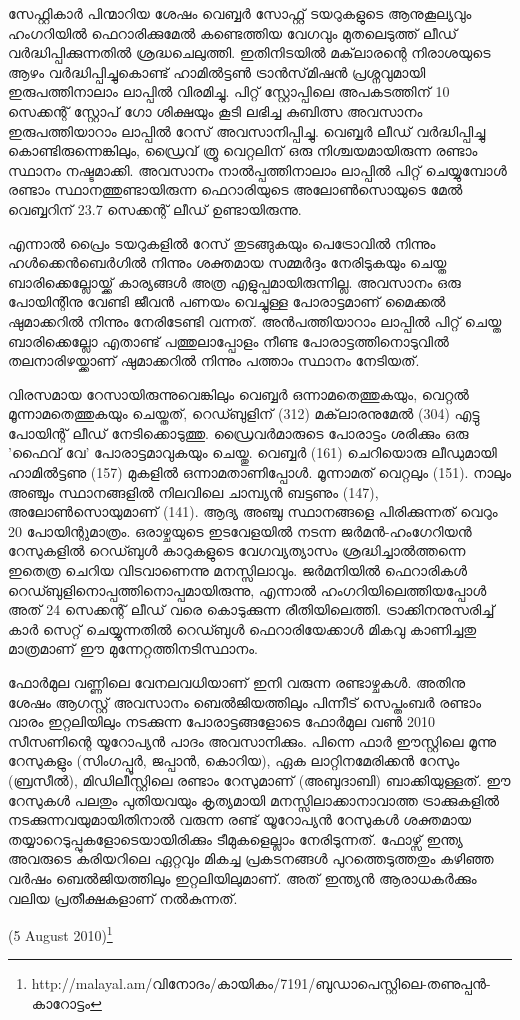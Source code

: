 സേഫ്റ്റികാര്‍ പിന്മാറിയ ശേഷം വെബ്ബര്‍ സോഫ്റ്റ് ടയറുകളുടെ ആനുകൂല്യവും ഹംഗറിയില്‍ ഫെറാരിക്കുമേല്‍ കണ്ടെത്തിയ 
വേഗവും മുതലെടുത്ത് ലീഡ് വര്‍ദ്ധിപ്പിക്കുന്നതില്‍ ശ്രദ്ധചെലുത്തി. ഇതിനിടയില്‍ മക്‌ലാരന്റെ നിരാശയുടെ ആഴം 
വര്‍ദ്ധിപ്പിച്ചുകൊണ്ട് ഹാമില്‍ട്ടണ്‍ ട്രാന്‍സ്‌മിഷന്‍ പ്രശ്നവുമായി ഇരുപത്തിനാലാം ലാപ്പില്‍ വിരമിച്ചു. പിറ്റ് സ്റ്റോപ്പിലെ 
അപകടത്തിന് 10 സെക്കന്റ് സ്റ്റോപ് ഗോ ശിക്ഷയും കൂടി ലഭിച്ച കുബിത്സ അവസാനം ഇരുപത്തിയാറാം ലാപ്പില്‍ 
റേസ് അവസാനിപ്പിച്ചു. വെബ്ബര്‍ ലീഡ് വര്‍ദ്ധിപ്പിച്ചു കൊണ്ടിരുന്നെങ്കിലും, ഡ്രൈവ് ത്രൂ വെറ്റലിന് ഒരു 
നിശ്ചയമായിരുന്ന രണ്ടാം സ്ഥാനം നഷ്ടമാക്കി. അവസാനം നാല്‍പ്പത്തിനാലാം ലാപ്പില്‍ പിറ്റ് ചെയ്യുമ്പോള്‍ രണ്ടാം 
സ്ഥാനത്തുണ്ടായിരുന്ന ഫെറാരിയുടെ അലോണ്‍സൊയുടെ മേല്‍ വെബ്ബറിന് 23.7 സെക്കന്റ് ലീഡ് ഉണ്ടായിരുന്നു.

എന്നാല്‍ പ്രൈം ടയറുകളില്‍ റേസ് തുടങ്ങുകയും പെട്രോവില്‍ നിന്നും ഹള്‍ക്കെന്‍ബെര്‍ഗില്‍ നിന്നും ശക്തമായ സമ്മര്‍ദ്ദം 
നേരിടുകയും ചെയ്ത ബാരിക്കെല്ലോയ്ക്ക് കാര്യങ്ങള്‍ അത്ര എളുപ്പമായിരുന്നില്ല. അവസാനം ഒരു പോയിന്റിനു വേണ്ടി ജീവന്‍ 
പണയം വെച്ചുള്ള പോരാട്ടമാണ് മൈക്കല്‍ ഷുമാക്കറില്‍ നിന്നും നേരിടേണ്ടി വന്നത്. അന്‍പത്തിയാറാം ലാപ്പില്‍ പിറ്റ് 
ചെയ്ത ബാരിക്കെല്ലോ എതാണ്ട് പത്തുലാപ്പോളം നീണ്ട പോരാട്ടത്തിനൊടുവില്‍ തലനാരിഴയ്ക്കാണ് ഷുമാക്കറില്‍ നിന്നും 
പത്താം സ്ഥാനം നേടിയത്.

വിരസമായ റേസായിരുന്നുവെങ്കിലും വെബ്ബര്‍ ഒന്നാമതെത്തുകയും, വെറ്റല്‍ മൂന്നാമതെത്തുകയും ചെയ്തത്, റെഡ്ബുളിന് 
(312) മക്‌ലാരനുമേല്‍ (304) എട്ടു പോയിന്റ് ലീഡ് നേടിക്കൊടുത്തു. ഡ്രൈവര്‍മാരുടെ പോരാട്ടം ശരിക്കും ഒരു 'ഫൈവ് 
വേ' പോരാട്ടമാവുകയും ചെയ്തു. വെബ്ബര്‍ (161) ചെറിയൊരു ലീഡുമായി ഹാമില്‍ട്ടണു (157) മുകളില്‍ ഒന്നാമതാണിപ്പോള്‍. 
മൂന്നാമത് വെറ്റലും (151). നാലും അഞ്ചും സ്ഥാനങ്ങളില്‍ നിലവിലെ ചാമ്പ്യന്‍ ബട്ടണും (147), 
അലോണ്‍സൊയുമാണ് (141). ആദ്യ അഞ്ചു സ്ഥാനങ്ങളെ പിരിക്കുന്നത് വെറും 20 പോയിന്റുമാത്രം. ഒരാഴ്ചയുടെ 
ഇടവേളയില്‍ നടന്ന ജര്‍മന്‍-ഹംഗേറിയന്‍ റേസുകളില്‍ റെഡ്ബുള്‍ കാറുകളുടെ വേഗവ്യത്യാസം ശ്രദ്ധിച്ചാല്‍ത്തന്നെ 
ഇതെത്ര ചെറിയ വിടവാണെന്നു മനസ്സിലാവും. ജര്‍മനിയില്‍ ഫെറാരികള്‍ റെഡ്ബുളിനൊപ്പത്തിനൊപ്പമായിരുന്നു, 
എന്നാല്‍ ഹംഗറിയിലെത്തിയപ്പോള്‍ അത് 24 സെക്കന്റ് ലീഡ് വരെ കൊടുക്കുന്ന രീതിയിലെത്തി. ട്രാക്കിനനുസരിച്ച് 
കാര്‍ സെറ്റ് ചെയ്യുന്നതില്‍ റെഡ്ബുള്‍ ഫെറാരിയേക്കാള്‍ മികവു കാണിച്ചതു മാത്രമാണ് ഈ മുന്നേറ്റത്തിനടിസ്ഥാനം.

ഫോര്‍മുല വണ്ണിലെ വേനലവധിയാണ് ഇനി വരുന്ന രണ്ടാഴ്ചകള്‍. അതിനു ശേഷം ആഗസ്റ്റ് അവസാനം 
ബെല്‍ജിയത്തിലും പിന്നീട് സെപ്തംബര്‍ രണ്ടാം വാരം ഇറ്റലിയിലും നടക്കുന്ന പോരാട്ടങ്ങളോടെ ഫോര്‍മുല വണ്‍ 2010 
സീസണിന്റെ യൂറോപ്യന്‍ പാദം അവസാനിക്കും. പിന്നെ ഫാര്‍ ഈസ്റ്റിലെ മൂന്നു റേസുകളും (സിംഗപ്പൂര്‍, ജപ്പാന്‍, കൊറിയ),
ഏക ലാറ്റിനമേരിക്കന്‍ റേസും (ബ്രസീല്‍), മിഡിലീസ്റ്റിലെ രണ്ടാം റേസുമാണ് (അബുദാബി) ബാക്കിയുള്ളത്. ഈ 
റേസുകള്‍ പലതും പുതിയവയും കൃത്യമായി മനസ്സിലാക്കാനാവാത്ത ട്രാക്കുകളില്‍ നടക്കുന്നവയുമായിതിനാല്‍ വരുന്ന രണ്ട് 
യൂറോപ്യന്‍ റേസുകള്‍ ശക്തമായ തയ്യാറെടുപ്പുകളോടെയായിരിക്കും ടീമുകളെല്ലാം നേരിടുന്നത്. ഫോഴ്സ് ഇന്ത്യ അവരുടെ 
കരിയറിലെ ഏറ്റവും മികച്ച പ്രകടനങ്ങള്‍ പുറത്തെടുത്തതും കഴിഞ്ഞ വര്‍ഷം ബെല്‍ജിയത്തിലും ഇറ്റലിയിലുമാണ്. 
അത് ഇന്ത്യന്‍ ആരാധകര്‍ക്കും വലിയ പ്രതീക്ഷകളാണ് നല്‍കുന്നത്.

(5 August 2010)\footnote{http://malayal.am/വിനോദം/കായികം/7191/ബുഡാപെസ്റ്റിലെ-തണുപ്പന്‍-കാറോട്ടം}

\newpage
